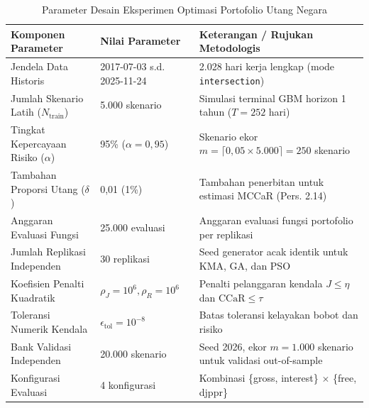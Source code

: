 \begin{table}[htbp]
\centering
\caption{Parameter Desain Eksperimen Optimasi Portofolio Utang Negara}
\label{tab:experiment_params}
\begin{tabular}{llp{7.5cm}}
\toprule
\textbf{Komponen Parameter} & \textbf{Nilai Parameter} & \textbf{Keterangan / Rujukan Metodologis} \\
\midrule
Jendela Data Historis & 2017-07-03 s.d. 2025-11-24 & 2.028 hari kerja lengkap (mode \texttt{intersection}) \\
Jumlah Skenario Latih ($N_{\text{train}}$) & 5.000 skenario & Simulasi terminal GBM horizon 1 tahun ($T=252$ hari) \\
Tingkat Kepercayaan Risiko ($\alpha$) & 95\% ($\alpha = 0{,}95$) & Skenario ekor $m = \lceil 0{,}05 \times 5.000 \rceil = 250$ skenario \\
Tambahan Proporsi Utang ($\delta$) & 0,01 (1\%) & Tambahan penerbitan untuk estimasi MCCaR (Pers. 2.14) \\
Anggaran Evaluasi Fungsi & 25.000 evaluasi & Anggaran evaluasi fungsi portofolio per replikasi \\
Jumlah Replikasi Independen & 30 replikasi & Seed generator acak identik untuk KMA, GA, dan PSO \\
Koefisien Penalti Kuadratik & $\rho_J = 10^6, \rho_R = 10^6$ & Penalti pelanggaran kendala $J \le \eta$ dan $\text{CCaR} \le \tau$ \\
Toleransi Numerik Kendala & $\epsilon_{\text{tol}} = 10^{-8}$ & Batas toleransi kelayakan bobot dan risiko \\
Bank Validasi Independen & 20.000 skenario & Seed 2026, ekor $m = 1.000$ skenario untuk validasi out-of-sample \\
Konfigurasi Evaluasi & 4 konfigurasi & Kombinasi \{gross, interest\} $\times$ \{free, djppr\} \\
\bottomrule
\end{tabular}
\end{table}